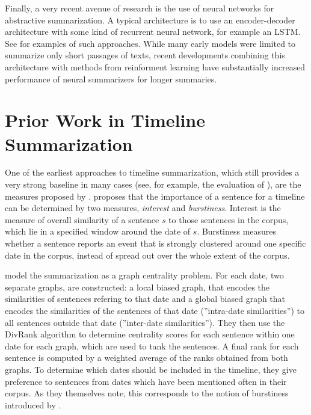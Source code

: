 \documentclass[a4paper,BCOR=10mm]{report}
\begin{document}


Finally, a very recent avenue of research is the use of neural networks for abstractive summarization. A typical architecture is to use an encoder-decoder architecture with some kind of recurrent neural network, for example an LSTM. See \citet{nallapati, rush} for examples of such approaches.
While many early models were limited to summarize only short passages of texts, recent developments combining this architecture with methods from reinforment learning have substantially increased performance of neural summarizers for longer summaries. \citet{paulus}



\section{Prior Work in Timeline Summarization}

One of the earliest approaches to timeline summarization, which still provides a very strong baseline in many cases (see, for example, the evaluation of \citet{markert}), are the measures proposed by \citet{chieu}.
\citeauthor{chieu} proposes that the importance of a sentence for a timeline can be determined by two measures, \textit{interest} and \textit{burstiness}.
Interest is the measure of overall similarity of a sentence $s$ to those sentences in the corpus, which lie in a specified window around the date of $s$.
Burstiness measures whether a sentence reports an event that is strongly clustered around one specific date in the corpus, instead of spread out over the whole extent of the corpus.


\citet{yan-evo} model the summarization as a graph centrality problem. For each date, two separate graphs, are constructed: a local biased graph, that encodes the similarities of sentences refering to that date and a global biased graph that encodes the similarities of the sentences of that date (''intra-date similarities'') to all sentences outside that date (''inter-date similarities'').
They then use the DivRank \citep{divrank} algorithm to determine centrality scores for each sentence within one date for each graph, which are used to tank the sentences.
A final rank for each sentence is computed by a weighted average of the ranks obtained from both graphs. To determine which dates should be included in the timeline, they give preference to sentences from dates which have been mentioned often in their corpus. As they themselves note, this corresponds to the notion of burstiness introduced by \citeauthor{chieu}.
\end{document}
